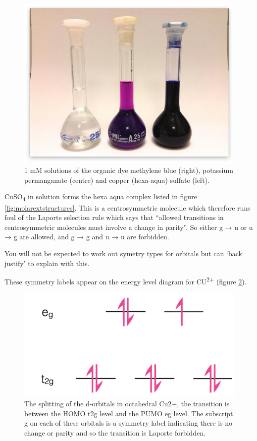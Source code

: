 \documentclass[
]{book}
\begin{document}
\begin{figure}

{\centering \includegraphics[width=0.7\linewidth]{images/Molar_extinction_coefficients} 

}

\caption{1 mM solutions of the organic dye methylene blue (right), potassium permanganate (centre) and copper (hexa-aqua) sulfate (left).}\label{fig:molarextsolutions}
\end{figure}

CuSO\textsubscript{4} in solution forms the hexa aqua complex listed in figure \ref{fig:molarextstructures}. This is a centrosymmetric molecule which therefore runs foul of the Laporte selection rule which says that ``allowed transitions in centrosymmetric molecules must involve a change in parity''. So either g → u or u → g are allowed, and g → g and u → u are forbidden.

You will not be expected to work out symetry types for orbitals but can `back justify' to explain with this.

These symmetry labels appear on the energy level diagram for CU\textsuperscript{2+} (figure \ref{fig:Cu}).

\begin{figure}

{\centering \includegraphics[width=0.4\linewidth]{images/CuIIenergylevels} 

}

\caption{The splitting of the d-orbitals in octahedral Cu2+, the transition is between the HOMO t2g level and the PUMO eg level. The subscript g on each of these orbitals is a symmetry label indicating there is no change or parity and so the transition is Laporte forbidden.}\label{fig:Cu}
\end{figure}
\end{document}
